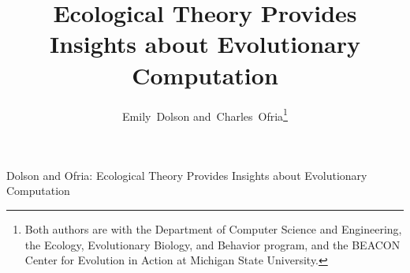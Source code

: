 \documentclass[journal]{IEEEtran}
\begin{document}
\title{Ecological Theory Provides Insights about Evolutionary Computation}


\author{Emily~Dolson
		and~Charles~Ofria\thanks{Both authors are with the Department of Computer Science and Engineering, the Ecology, Evolutionary Biology, and Behavior program, and the BEACON Center for Evolution in Action at Michigan State University.}}

%
{Dolson and Ofria: Ecological Theory Provides Insights about Evolutionary Computation}



\maketitle
\end{document}

